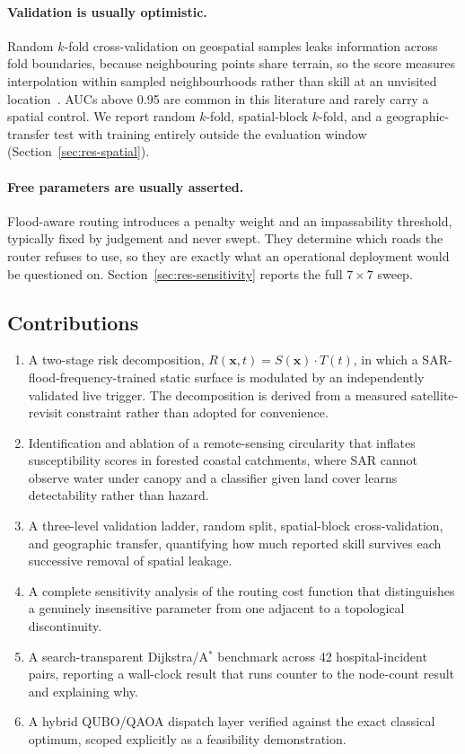 \documentclass[11pt,a4paper]{article}
\newcommand{\Sx}{S(\mathbf{x})}
\newcommand{\Tt}{T(t)}
\newcommand{\Rxt}{R(\mathbf{x},t)}
\begin{document}
\paragraph{Validation is usually optimistic.}
Random $k$-fold cross-validation on geospatial samples leaks information across
fold boundaries, because neighbouring points share terrain, so the score measures
interpolation within sampled neighbourhoods rather than skill at an unvisited
location~\citep{roberts2017,ploton2020,meyer2021}. AUCs above 0.95 are common in
this literature and rarely carry a spatial control. We report random $k$-fold,
spatial-block $k$-fold, and a geographic-transfer test with training entirely
outside the evaluation window (Section~\ref{sec:res-spatial}).

\paragraph{Free parameters are usually asserted.}
Flood-aware routing introduces a penalty weight and an impassability threshold,
typically fixed by judgement and never swept. They determine which roads the
router refuses to use, so they are exactly what an operational deployment would
be questioned on. Section~\ref{sec:res-sensitivity} reports the full
$7\times7$ sweep.

\subsection{Contributions}
\begin{enumerate}
\itemsep2pt
\item A two-stage risk decomposition, $\Rxt=\Sx\cdot\Tt$, in which a
      SAR-flood-frequency-trained static surface is modulated by an independently
      validated live trigger. The decomposition is derived from a measured
      satellite-revisit constraint rather than adopted for convenience.
\item Identification and ablation of a remote-sensing circularity that inflates
      susceptibility scores in forested coastal catchments, where SAR cannot
      observe water under canopy and a classifier given land cover learns
      detectability rather than hazard.
\item A three-level validation ladder, random split, spatial-block
      cross-validation, and geographic transfer, quantifying how much reported
      skill survives each successive removal of spatial leakage.
\item A complete sensitivity analysis of the routing cost function that
      distinguishes a genuinely insensitive parameter from one adjacent to a
      topological discontinuity.
\item A search-transparent Dijkstra/A$^\ast$ benchmark across 42
      hospital-incident pairs, reporting a wall-clock result that runs counter to
      the node-count result and explaining why.
\item A hybrid QUBO/QAOA dispatch layer verified against the exact classical
      optimum, scoped explicitly as a feasibility demonstration.
\end{enumerate}
\end{document}
